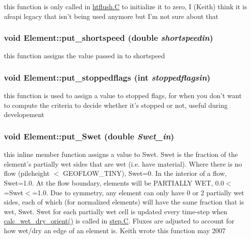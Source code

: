 this function is only called in \hyperlink{constant_8h_a21}{htflush.C} to initialize it to zero, I (Keith) think it is afeapi legacy that isn't being used anymore but I'm not sure about that 

\hypertarget{classElement_a83}{
\subsubsection[put\_\-shortspeed]{\setlength{\rightskip}{0pt plus 5cm}void Element::put\_\-shortspeed (double {\em shortspeedin})}}
\label{classElement_a83}


this function assigns the value passed in to shortspeed 

\hypertarget{classElement_a106}{
\subsubsection[put\_\-stoppedflags]{\setlength{\rightskip}{0pt plus 5cm}void Element::put\_\-stoppedflags (int {\em stoppedflagsin})}}
\label{classElement_a106}


this function is used to assign a value to stopped flags, for when you don't want to compute the criteria to decide whether it's stopped or not, useful during developement 

\hypertarget{classElement_a124}{
\subsubsection[put\_\-Swet]{\setlength{\rightskip}{0pt plus 5cm}void Element::put\_\-Swet (double {\em Swet\_\-in})}}
\label{classElement_a124}


this inline member function assigns a value to Swet. Swet is the fraction of the element's partially wet sides that are wet (i.e. have material). Where there is no flow (pileheight $<$ GEOFLOW\_\-TINY), Swet=0. In the interior of a flow, Swet=1.0. At the flow boundary, elements will be PARTIALLY WET, 0.0$<$=Swet$<$=1.0. Due to symmetry, any element can only have 0 or 2 partially wet sides, each of which (for normalized elements) will have the same fraction that is wet, Swet. Swet for each partially wet cell is updated every time-step when \hyperlink{classElement_a129}{calc\_\-wet\_\-dry\_\-orient()} is called in \hyperlink{constant_8h_a21}{step.C}. Fluxes are adjusted to account for how wet/dry an edge of an element is. Keith wrote this function may 2007 

